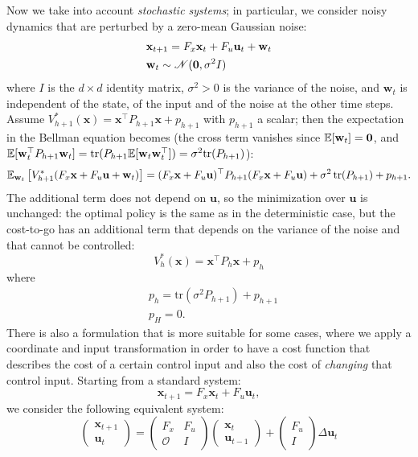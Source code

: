 \documentclass[10pt, a4paper]{report}
\begin{document}
\noindent Now we take into account \textit{stochastic systems}; in particular, we consider noisy dynamics that are perturbed by a zero-mean Gaussian noise:\begin{align}
    &\mathbf x_{t+1}=F_x\mathbf x_t+F_u\mathbf u_t +\mathbf w_t\\ 
    &\mathbf w_t\sim \mathscr{N}(\mathbf 0,\sigma^2 I)
\end{align}
where $I$ is the $d\times d$ identity matrix, $\sigma^2>0$ is the variance of the noise, and $\mathbf w_t$ is independent of the state, of the input and of the noise at the other time steps. Assume $V_{h+1}^*(\mathbf x)=\mathbf x^\top P_{h+1}\mathbf x+p_{h+1}$ with $p_{h+1}$ a scalar; then the expectation in the Bellman equation becomes (the cross term vanishes since ${\mathbb E}[\mathbf w_t]=\mathbf 0$, and ${\mathbb E}[\mathbf w_t^\top P_{h+1}\mathbf w_t]=\text{tr}(P_{h+1}{\mathbb E}[\mathbf w_t\mathbf w_t^\top])=\sigma^2\text{tr}(P_{h+1})$):\begin{align}
    {\mathbb E}_{\mathbf w_t}\left[V_{h+1}^*(F_x\mathbf x+F_u\mathbf u+\mathbf w_t)\right]=(F_x\mathbf x+F_u\mathbf u)^\top P_{h+1}(F_x\mathbf x+F_u\mathbf u)+\sigma^2\,\text{tr}(P_{h+1})+p_{h+1}.
\end{align}
The additional term does not depend on $\mathbf u$, so the minimization over $\mathbf u$ is unchanged: the optimal policy is the same as in the deterministic case, but the cost-to-go has an additional term that depends on the variance of
the noise and that cannot be controlled: \begin{equation}
    V_h^*(\mathbf x)=\mathbf x^\top P_h\mathbf x+p_h 
\end{equation}
where \begin{align}
    &p_h=\text{tr}\left(\sigma^2P_{h+1}\right)+p_{h+1}\\
    &p_{H}=0.
\end{align}
There is also a formulation that is more suitable for some cases, where we apply a coordinate and input transformation in order to have a cost function that describes the cost of a certain control input and also the cost of \textit{changing} that control input. Starting from a standard system:\begin{equation}
    \mathbf x_{t+1}=F_x\mathbf x_t+F_u\mathbf u_t,
\end{equation}
we consider the following equivalent system:\begin{equation}
    \begin{pmatrix}
    \mathbf{x}_{t+1} \\
    \mathbf{u}_t
\end{pmatrix}
=
\begin{pmatrix}
    F_x & F_u \\
    \mathcal O   & I
\end{pmatrix}
\begin{pmatrix}
    \mathbf{x}_t \\
    \mathbf{u}_{t-1}
\end{pmatrix}
+
\begin{pmatrix}
    F_u \\
    I
\end{pmatrix}
\Delta\mathbf{u}_t
\end{equation}
\end{document}

